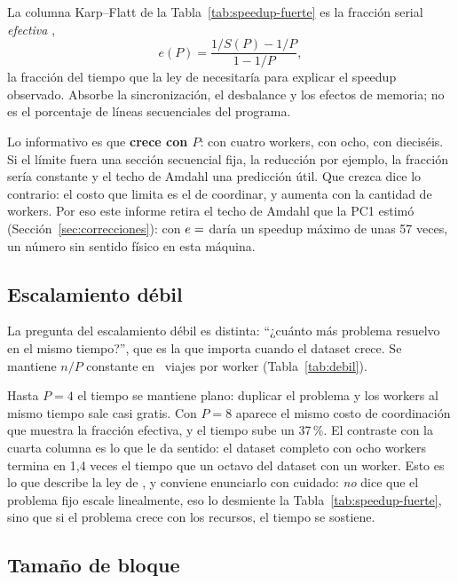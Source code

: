 La columna Karp--Flatt de la Tabla~\ref{tab:speedup-fuerte} es la fracción serial \emph{efectiva}
\parencite{karpflatt1990},
\[
  e(P) = \frac{1/S(P) - 1/P}{1 - 1/P},
\]
la fracción del tiempo que la ley de \textcite{amdahl1967} necesitaría para explicar el speedup
observado. Absorbe la sincronización, el desbalance y los efectos de memoria; no es el porcentaje de
líneas secuenciales del programa.

Lo informativo es que \textbf{crece con $P$}:  con cuatro workers,  con
ocho,  con dieciséis. Si el límite fuera una sección secuencial fija, la reducción por
ejemplo, la fracción sería constante y el techo de Amdahl una predicción útil. Que crezca dice lo
contrario: el costo que limita es el de coordinar, y aumenta con la cantidad de workers. Por eso este
informe retira el techo de Amdahl que la PC1 estimó (Sección~\ref{sec:correcciones}): con
$e = \cifra{kf-p4}$ daría un speedup máximo de unas 57 veces, un número sin sentido físico en esta
máquina.

\subsection{Escalamiento débil}\label{sec:debil}

La pregunta del escalamiento débil es distinta: \enquote{¿cuánto más problema resuelvo en el mismo
tiempo?}, que es la que importa cuando el dataset crece. Se mantiene $n / P$ constante en
~viajes por worker (Tabla~\ref{tab:debil}).



Hasta $P = 4$ el tiempo se mantiene plano: duplicar el problema y los workers al mismo tiempo sale
casi gratis. Con $P = 8$ aparece el mismo costo de coordinación que muestra la fracción efectiva, y
el tiempo sube un 37\,\%. El contraste con la cuarta columna es lo que le da sentido: el dataset
completo con ocho workers termina en 1,4 veces el tiempo que un octavo del dataset con un worker.
Esto es lo que describe la ley de \textcite{gustafson1988}, y conviene enunciarlo con cuidado:
\emph{no} dice que el problema fijo escale linealmente, eso lo desmiente la Tabla~\ref{tab:speedup-fuerte},
sino que si el problema crece con los recursos, el tiempo se sostiene.

\subsection{Tamaño de bloque}\label{sec:chunk}

